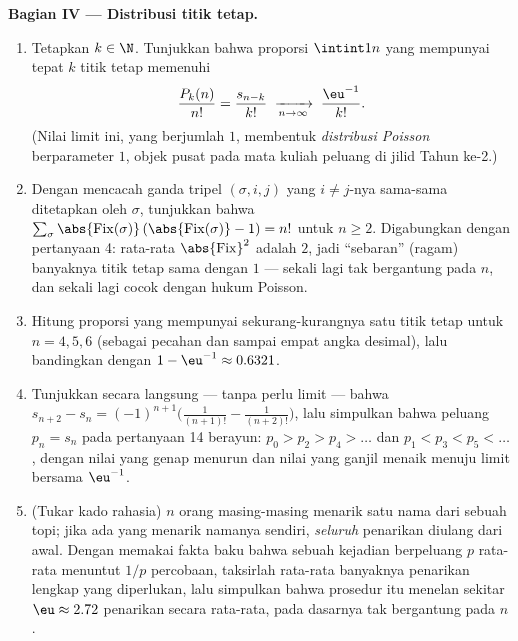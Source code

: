 \begin{problem}
\medskip
\noindent\textbf{Bagian IV --- Distribusi titik tetap.}
\begin{enumerate}[resume]
  \item Tetapkan $k \in \N$. Tunjukkan bahwa proporsi 
        $\intint1n$ yang mempunyai tepat $k$ titik tetap memenuhi
        \[
        \frac{P_k(n)}{n!} = \frac{s_{n-k}}{k!}
        \;\xrightarrow[n \to \infty]{}\; \frac{\eu^{-1}}{k!} .
        \]
        (Nilai limit ini, yang berjumlah $1$, membentuk
        \emph{distribusi Poisson} berparameter $1$, objek pusat
        pada mata kuliah peluang di jilid Tahun ke-2.)
  \item Dengan mencacah ganda tripel $(\sigma, i, j)$ yang $i
        \neq j$-nya sama-sama ditetapkan oleh $\sigma$, tunjukkan bahwa
        $\sum_\sigma \abs{\mathrm{Fix}(\sigma)}\,
        (\abs{\mathrm{Fix}(\sigma)} - 1) = n!$ untuk $n \geq 2$.
        Digabungkan dengan pertanyaan 4: rata-rata
        $\abs{\mathrm{Fix}}^2$ adalah $2$, jadi ``sebaran'' (ragam)
        banyaknya titik tetap sama dengan $1$ --- sekali lagi
        tak bergantung pada $n$, dan sekali lagi cocok dengan hukum Poisson.
  \item Hitung proporsi  yang mempunyai sekurang-kurangnya satu
        titik tetap untuk $n = 4, 5, 6$ (sebagai pecahan dan sampai empat
        angka desimal), lalu bandingkan dengan $1 - \eu^{-1} \approx
        0.6321$.
  \item Tunjukkan secara langsung --- tanpa perlu limit --- bahwa $s_{n+2} - s_n
        = (-1)^{n+1}\bigl(\frac1{(n+1)!} - \frac1{(n+2)!}\bigr)$,
        lalu simpulkan bahwa peluang $p_n = s_n$ pada
        pertanyaan 14 berayun: $p_0 > p_2 > p_4 > \dots$ dan
        $p_1 < p_3 < p_5 < \dots$, dengan nilai yang genap menurun dan
        nilai yang ganjil menaik menuju limit bersama
        $\eu^{-1}$.
  \item (Tukar kado rahasia) $n$ orang masing-masing menarik satu nama dari sebuah topi;
        jika ada yang menarik namanya sendiri, \emph{seluruh} penarikan
        diulang dari awal. Dengan memakai fakta baku bahwa sebuah
        kejadian berpeluang $p$ rata-rata menuntut $1/p$ percobaan,
        taksirlah rata-rata banyaknya penarikan lengkap yang diperlukan,
        lalu simpulkan bahwa prosedur itu menelan sekitar $\eu \approx
        2.72$ penarikan secara rata-rata, pada dasarnya tak bergantung pada
        $n$.
\end{enumerate}


\end{problem}

